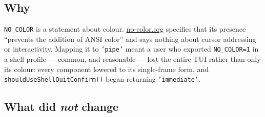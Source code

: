 

\subsection{Why}\label{record-273-why}

\texttt{N\allowbreak{}O\allowbreak{}\_\allowbreak{}C\allowbreak{}O\allowbreak{}L\allowbreak{}O\allowbreak{}R} is a statement about colour. \href{https://no-color.org}{no-color.org} specifies that its presence ``prevents the addition of ANSI color'' and says nothing about cursor addressing or interactivity. Mapping it to \texttt{'\allowbreak{}p\allowbreak{}i\allowbreak{}p\allowbreak{}e\allowbreak{}'} meant a user who exported \texttt{N\allowbreak{}O\allowbreak{}\_\allowbreak{}C\allowbreak{}O\allowbreak{}L\allowbreak{}O\allowbreak{}R\allowbreak{}=\allowbreak{}1} in a shell profile --- common, and reasonable --- lost the entire TUI rather than only its colour: every component lowered to its single-frame form, and \texttt{s\allowbreak{}h\allowbreak{}o\allowbreak{}u\allowbreak{}l\allowbreak{}d\allowbreak{}U\allowbreak{}s\allowbreak{}e\allowbreak{}S\allowbreak{}h\allowbreak{}e\allowbreak{}l\allowbreak{}l\allowbreak{}Q\allowbreak{}u\allowbreak{}i\allowbreak{}t\allowbreak{}C\allowbreak{}o\allowbreak{}n\allowbreak{}f\allowbreak{}i\allowbreak{}r\allowbreak{}m\allowbreak{}(\allowbreak{})} began returning \texttt{'\allowbreak{}i\allowbreak{}m\allowbreak{}m\allowbreak{}e\allowbreak{}d\allowbreak{}i\allowbreak{}a\allowbreak{}t\allowbreak{}e\allowbreak{}'}.

\subsection{\texorpdfstring{What did \emph{not} change}{What did not change}}\label{record-273-what-did-not-change}

